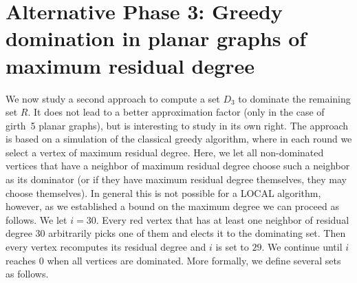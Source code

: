 
\section{Alternative Phase 3: Greedy domination in planar graphs of maximum
residual degree}\label{sec:greedy}

%

We now study a second approach to compute a set $D_3$ to dominate
the remaining set $R$. It does not lead to a better approximation factor
(only in the case of girth~5 planar graphs), but is interesting to study
in its own right. The approach is based on a
simulation of the classical greedy algorithm, where in each
round we select a vertex of maximum residual degree. Here, we let all
non-dominated vertices that have a neighbor of maximum residual degree
choose such a neighbor as its dominator (or if they have maximum
residual degree themselves, they may choose themselves). In general
this is not possible for a LOCAL algorithm, however, as we established
a bound on the maximum degree we can proceed as follows.  We let
$i=30$. Every red vertex that has at least one neighbor of residual
degree $30$ arbitrarily picks one of them and elects it to the
dominating set. Then every vertex recomputes its residual degree and
$i$ is set to $29$. We continue until $i$ reaches $0$ when all
vertices are dominated. More formally, we define several sets as
follows.

